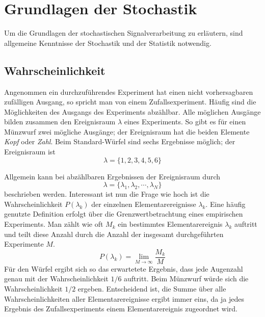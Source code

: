 \section{Grundlagen der Stochastik \label{sec:Stochastik}}
Um die Grundlagen der stochastischen Signalverarbeitung zu
erläutern, sind allgemeine Kenntnisse der Stochastik und der
Statistik notwendig.

\subsection{Wahrscheinlichkeit}
Angenommen ein durchzuführendes Experiment hat einen nicht
vorhersagbaren zufälligen Ausgang, so spricht man von einem
Zufallsexperiment. Häufig sind die Möglichkeiten des Ausgangs des
Experiments abzählbar. Alle möglichen Ausgänge bilden zusammen den
Ereignisraum $\lambda$ eines Experiments. So gibt es \zB für einen
Münzwurf zwei mögliche Ausgänge; der Ereignisraum hat die beiden
Elemente {\em Kopf} oder {\em Zahl}. Beim Standard-Würfel sind
sechs Ergebnisse möglich; der Ereignisraum ist
\begin{equation}\label{eq:Bsp:EreignisraumE_Wuerfel}
    \lambda = \{1,2,3,4,5,6 \}
\end{equation}

Allgemein kann bei abzählbaren Ergebnissen der Ereignisraum durch
\begin{equation}\label{eq:BSP:EreignisraumAllg}
    \lambda = \{ \lambda_1, \lambda_2,\cdots,\lambda_N \}
\end{equation}
beschrieben werden. Interessant ist nun die Frage wie hoch ist die
Wahrscheinlichkeit $P(\lambda_k)$ der einzelnen
Elementarereignisse $\lambda_k$. Eine häufig genutzte Definition
erfolgt über die Grenzwertbetrachtung eines empirischen
Experiments. Man zählt wie oft $M_k$ ein bestimmtes
Elementarereignis $\lambda_k$ auftritt und teilt diese Anzahl
durch die Anzahl der insgesamt durchgeführten Experimente $M$.
\begin{equation}\label{eq:Def:Wahrscheinlichkeit}
    P(\lambda_k) = \lim_{M\rightarrow \infty} \frac{M_k}{M}
\end{equation}
Für den Würfel ergibt sich so das erwartetete Ergebnis, dass jede
Augenzahl genau mit der Wahrscheinlichkeit $1/6$ auftritt. Beim
Münzwurf würde sich die Wahrscheinlichkeit $1/2$ ergeben.
Entscheidend ist, die Summe über alle Wahrscheinlichkeiten aller
Elementarereignisse ergibt immer eins, da ja jedes Ergebnis des
Zufallsexperiments einem Elementarereignis zugeordnet wird.

